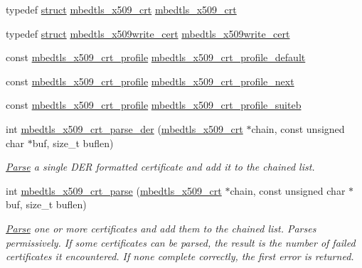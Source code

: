 \begin{DoxyCompactItemize}
\item 
typedef \hyperlink{interfacestruct}{struct} \hyperlink{structmbedtls__x509__crt}{mbedtls\+\_\+x509\+\_\+crt} \hyperlink{group__x509__module_ga836544fec94d5bc02bc97aa87885b9d9}{mbedtls\+\_\+x509\+\_\+crt}
\item 
typedef \hyperlink{interfacestruct}{struct} \hyperlink{structmbedtls__x509write__cert}{mbedtls\+\_\+x509write\+\_\+cert} \hyperlink{group__x509__module_gacc3115587f8d882a7a137c38d6939e07}{mbedtls\+\_\+x509write\+\_\+cert}
\item 
const \hyperlink{structmbedtls__x509__crt__profile}{mbedtls\+\_\+x509\+\_\+crt\+\_\+profile} \hyperlink{group__x509__module_ga9cd2de10ffeff0f339abcc1ba7e26fdf}{mbedtls\+\_\+x509\+\_\+crt\+\_\+profile\+\_\+default}
\item 
const \hyperlink{structmbedtls__x509__crt__profile}{mbedtls\+\_\+x509\+\_\+crt\+\_\+profile} \hyperlink{group__x509__module_ga8ab1f8a044fd25f76ecb4ba15c6d5bcd}{mbedtls\+\_\+x509\+\_\+crt\+\_\+profile\+\_\+next}
\item 
const \hyperlink{structmbedtls__x509__crt__profile}{mbedtls\+\_\+x509\+\_\+crt\+\_\+profile} \hyperlink{group__x509__module_gaf09067a39129236125e353a68ceb45d6}{mbedtls\+\_\+x509\+\_\+crt\+\_\+profile\+\_\+suiteb}
\item 
int \hyperlink{group__x509__module_ga003c2483a2691e025641fa9d68d4a96a}{mbedtls\+\_\+x509\+\_\+crt\+\_\+parse\+\_\+der} (\hyperlink{structmbedtls__x509__crt}{mbedtls\+\_\+x509\+\_\+crt} $\ast$chain, const unsigned char $\ast$buf, size\+\_\+t buflen)
\begin{DoxyCompactList}\small\item\em \hyperlink{struct_parse}{Parse} a single D\+ER formatted certificate and add it to the chained list. \end{DoxyCompactList}\item 
int \hyperlink{group__x509__module_ga033567483649030f7f859db4f4cb7e14}{mbedtls\+\_\+x509\+\_\+crt\+\_\+parse} (\hyperlink{structmbedtls__x509__crt}{mbedtls\+\_\+x509\+\_\+crt} $\ast$chain, const unsigned char $\ast$buf, size\+\_\+t buflen)
\begin{DoxyCompactList}\small\item\em \hyperlink{struct_parse}{Parse} one or more certificates and add them to the chained list. Parses permissively. If some certificates can be parsed, the result is the number of failed certificates it encountered. If none complete correctly, the first error is returned. \end{DoxyCompactList}\item 

\end{DoxyCompactItemize}
